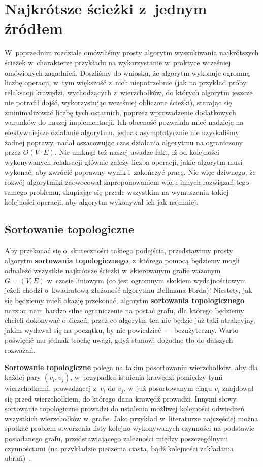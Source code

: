 \chapter{Najkrótsze ścieżki z~jednym źródłem}

W~poprzednim rozdziale omówiliśmy prosty algorytm wyszukiwania najkrótszych ścieżek w~charakterze przykładu na wykorzystanie w~praktyce wcześniej omówionych zagadnień. Doszliśmy do wniosku, że algorytm wykonuje ogromną liczbę operacji, w~tym większość z~nich niepotrzebnie (jak na przykład próby relaksacji krawędzi, wychodzących z~wierzchołków, do których algorytm jeszcze nie potrafił dojść, wykorzystując wcześniej obliczone ścieżki), starając się zminimalizować liczbę tych ostatnich, poprzez wprowadzenie dodatkowych warunków do naszej implementacji. Ich obecność pozwalała mieć nadzieję na efektywniejsze działanie algorytmu, jednak asymptotycznie nie uzyskaliśmy żadnej poprawy, nadal oszacowując czas działania algorytmu na ograniczony przez $O \left( V \cdot E \right)$. Nie umknął też naszej uwadze fakt, iż od kolejności wykonywanych relaksacji głównie zależy liczba operacji, jakie algorytm musi wykonać, aby zwrócić poprawny wynik i~zakończyć pracę. Nic więc dziwnego, że rozwój algorytmiki zaowocował zaproponowaniem wielu innych rozwiązań tego samego problemu, skupiając się przede wszystkim na wymuszeniu takiej kolejności operacji, aby algorytm wykonywał ich jak najmniej.

\section{Sortowanie topologiczne}

Aby przekonać się o~skuteczności takiego podejścia, przedstawimy prosty algorytm \textbf{sortowania topologicznego}, z~którego pomocą będziemy mogli odnaleźć wszystkie najkrótsze ścieżki w~skierowanym grafie ważonym $G = \left( V, E \right)$ w~czasie liniowym (co jest ogromnym skokiem wydajnościowym jeżeli chodzi o~kwadratową złożoność algorytmu Bellmana-Forda)! Niestety, jak się będziemy mieli okazję przekonać, algorytm \textbf{sortowania topologicznego} narzuci nam bardzo silne ograniczenie na postać grafu, dla którego będziemy chcieli dokonywać obliczeń, przez co algorytm ten nie będzie już taki atrakcyjny, jakim wydawał się na początku, by nie powiedzieć~--- bezużyteczny. Warto poświęcić mu jednak trochę uwagi, gdyż stanowi dogodne tło do dalszych rozważań.

\textbf{Sortowanie topologiczne} polega na takim posortowaniu wierzchołków, aby dla każdej pary $ \left( v_{i}, v_{j} \right)$, w~przypadku istnienia krawędzi pomiędzy tymi wierzchołkami, prowadzącej z~$v_{i}$ do $v_{j}$, w~już posortowanym ciągu $v_{i}$ znajdował się przed wierzchołkiem, do którego dana krawędź prowadzi. Innymi słowy sortowanie topologiczne prowadzi do ustalenia możliwej kolejności odwiedzeń wszystkich wierzchołków w~grafie. Jako przykład w~literaturze najczęściej można spotkać problem stworzenia listy kolejno wykonywanych czynności na podstawie posiadanego grafu, przedstawiającego zależności między poszczególnymi czynnościami (na przykładzie pieczenia ciasta, bądź kolejności zakładania ubrań)~\cite[$22.4$]{Cormen}. 

